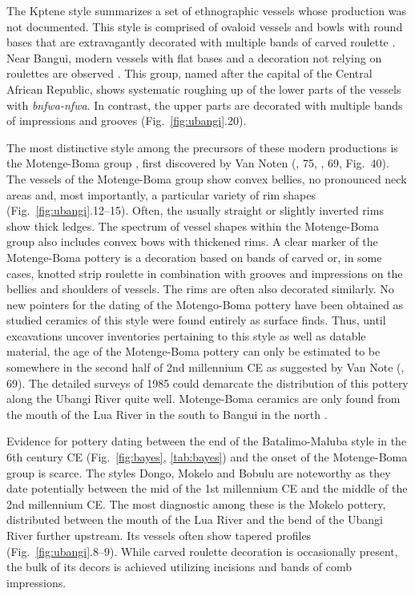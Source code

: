 \documentclass[smallextended,natbib]{svjour3}       %
\begin{document}
The Kptene style summarizes a set of ethnographic vessels whose production was not documented. This style is comprised of ovaloid vessels and bowls with round bases that are extravagantly decorated with multiple bands of carved roulette \citep[103--105]{Seidensticker.2021e}. Near Bangui, modern vessels with flat bases and a decoration not relying on roulettes are observed \citep[112--114]{Seidensticker.2021e}. This group, named after the capital of the Central African Republic, shows systematic roughing up of the lower parts of the vessels with \textit{bnfwa-nfwa}. In contrast, the upper parts are decorated with multiple bands of impressions and grooves (Fig.~\ref{fig:ubangi}.20).

The most distinctive style among the precursors of these modern productions is the Motenge-Boma group \citep[99--103]{Seidensticker.2021e}, first discovered by Van Noten (\citeyear{vanNoten.1978}, 75, \citeyear{vanNoten.1982a}, 69, Fig.~40). The vessels of the Motenge-Boma group show convex bellies, no pronounced neck areas and, most importantly, a particular variety of rim shapes (Fig.~\ref{fig:ubangi}.12--15). Often, the usually straight or slightly inverted rims show thick ledges. The spectrum of vessel shapes within the Motenge-Boma group also includes convex bows with thickened rims. A clear marker of the Motenge-Boma pottery is a decoration based on bands of carved or, in some cases, knotted strip roulette in combination with grooves and impressions on the bellies and shoulders of vessels. The rims are often also decorated similarly. No new pointers for the dating of the Motengo-Boma pottery have been obtained as studied ceramics of this style were found entirely as surface finds. Thus, until excavations uncover inventories pertaining to this style as well as datable material, the age of the Motenge-Boma pottery can only be estimated to be somewhere in the second half of 2nd millennium CE as suggested by Van Note (\citeyear{vanNoten.1982a}, 69). The detailed surveys of 1985 could demarcate the distribution of this pottery along the Ubangi River quite well. Motenge-Boma ceramics are only found from the mouth of the Lua River in the south to Bangui in the north \citep[102 Fig.~37]{Seidensticker.2021e}.

Evidence for pottery dating between the end of the Batalimo-Maluba style in the 6th century CE (Fig.~\ref{fig:bayes}, \ref{tab:bayes}) and the onset of the Motenge-Boma group is scarce. The styles Dongo, Mokelo and Bobulu \citep[Fig.~\ref{fig:chrono};][86--95]{Seidensticker.2021e} are noteworthy as they date potentially between the mid of the 1st millennium CE and the middle of the 2nd millennium CE. The most diagnostic among these is the Mokelo pottery, distributed between the mouth of the Lua River and the bend of the Ubangi River further upstream. Its vessels often show tapered profiles (Fig.~\ref{fig:ubangi}.8--9). While carved roulette decoration is occasionally present, the bulk of its decors is achieved utilizing incisions and bands of comb impressions.
\end{document}

